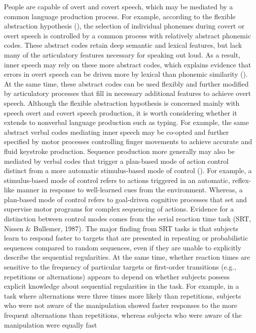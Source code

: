 \documentclass[floatsintext,man]{apa6}
\theoremstyle{definition}
\theoremstyle{definition}
\theoremstyle{definition}
\theoremstyle{remark}
\begin{document}
People are capable of overt and covert speech, which may be mediated by
a common language production process. For example, according to the
flexible abstraction hypothesis (), the selection of individual phonemes
during covert or overt speech is controlled by a common process with
relatively abstract phonemic codes. These abstract codes retain deep
semantic and lexical features, but lack many of the articulatory
features necessary for speaking out loud. As a result, inner speech may
rely on these more abstract codes, which explains evidence that errors
in overt speech can be driven more by lexical than phonemic similarity
(). At the same time, these abstract codes can be used flexibly and
further modified by articulatory processes that fill in necessary
additional features to achieve overt speech. Although the flexible
abstraction hypothesis is concerned mainly with speech overt and covert
speech production, it is worth considering whether it extends to
nonverbal language production such as typing. For example, the same
abstract verbal codes mediating inner speech may be co-opted and further
specified by motor processes controlling finger movements to achieve
accurate and fluid keystroke production. Sequence production more
generally may also be mediated by verbal codes that trigger a plan-based
mode of action control distinct from a more automatic stimulus-based
mode of control (). For example, a stimulus-based mode of control refers
to actions triggered in an automatic, reflex-like manner in response to
well-learned cues from the environment. Whereas, a plan-based mode of
control refers to goal-driven cognitive processes that set and supervise
motor programs for complex sequencing of actions. Evidence for a
distinction between control modes comes from the serial reaction time
task (SRT, Nissen \& Bullemer, 1987). The major finding from SRT tasks
is that subjects learn to respond faster to targets that are presented
in repeating or probabilistic sequences compared to random sequences,
even if they are unable to explicitly describe the sequential
regularities. At the same time, whether reaction times are sensitive to
the frequency of particular targets or first-order transitions (e.g.,
repetitions or alternations) appears to depend on whether subjects
possess explicit knowledge about sequential regularities in the task.
For example, in a task where alternations were three times more likely
than repetitions, subjects who were not aware of the manipulation showed
faster responses to the more frequent alternations than repetitions,
whereas subjects who were aware of the manipulation were equally fast
\end{document}
